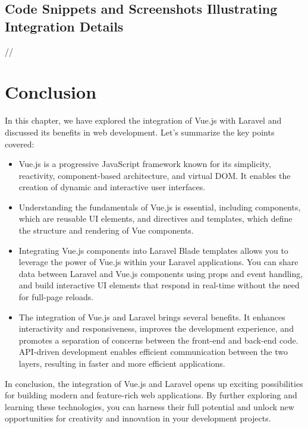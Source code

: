 \subsection{Code Snippets and Screenshots Illustrating Integration Details}
//
\newpage
\section{Conclusion}
In this chapter, we have explored the integration of Vue.js with Laravel and discussed its benefits in web development. Let's summarize the key points covered:
\begin{itemize}
    \item Vue.js is a progressive JavaScript framework known for its simplicity, reactivity, component-based architecture, and virtual DOM. It enables the creation of dynamic and interactive user interfaces.

    \item Understanding the fundamentals of Vue.js is essential, including components, which are reusable UI elements, and directives and templates, which define the structure and rendering of Vue components.

    \item Integrating Vue.js components into Laravel Blade templates allows you to leverage the power of Vue.js within your Laravel applications. You can share data between Laravel and Vue.js components using props and event handling, and build interactive UI elements that respond in real-time without the need for full-page reloads.

    \item The integration of Vue.js and Laravel brings several benefits. It enhances interactivity and responsiveness, improves the development experience, and promotes a separation of concerns between the front-end and back-end code. API-driven development enables efficient communication between the two layers, resulting in faster and more efficient applications.
\end{itemize}
In conclusion, the integration of Vue.js and Laravel opens up exciting possibilities for building modern and feature-rich web applications. By further exploring and learning these technologies, you can harness their full potential and unlock new opportunities for creativity and innovation in your development projects.
